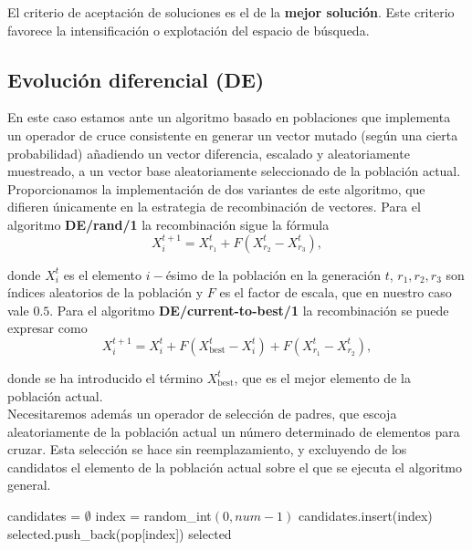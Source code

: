 \documentclass[12pt]{article}
\begin{document}
El criterio de aceptación de soluciones es el de la \textbf{mejor solución}. Este criterio favorece la intensificación  o explotación del espacio de búsqueda.

\subsection*{Evolución diferencial (DE)}
\label{ed}

En este caso estamos ante un algoritmo basado en poblaciones que implementa un operador de cruce consistente en generar un vector mutado (según una cierta probabilidad) añadiendo un vector diferencia, escalado y aleatoriamente muestreado, a un vector base aleatoriamente seleccionado de la población actual.\\

Proporcionamos la implementación de dos variantes de este algoritmo, que difieren únicamente en la estrategia de recombinación de vectores. Para el algoritmo \textbf{DE/rand/1} la recombinación sigue la fórmula
$$X^{t+1}_i= X^t_{r_1} + F (X^t_{r_2} - X^t_{r_3}),$$

donde $X^t_i$ es el elemento $i-$ésimo de la población en la generación $t$, $r_1, r_2, r_3$ son índices aleatorios de la población y $F$ es el factor de escala, que en nuestro caso vale $0.5$. Para el algoritmo \textbf{DE/current-to-best/1} la recombinación se puede expresar como
$$X^{t+1}_i= X^t_{i} + F (X^t_{\text{best}} - X^t_{i}) + F(X^t_{r_1} - X^t_{r_2}),$$

donde se ha introducido el término $X^t_{\text{best}}$, que es el mejor elemento de la población actual.\\

Necesitaremos además un operador de selección de padres, que escoja aleatoriamente de la población actual un número determinado de elementos para cruzar. Esta selección se hace sin reemplazamiento, y excluyendo de los candidatos el elemento de la población actual sobre el que se ejecuta el algoritmo general.

\begin{algorithm}[h!]
\begin{algorithmic}


\State candidates = $\emptyset$  
  
        \State index = random\_int$(0, num-1)$
            \State candidates.insert(index)
        \EndIf
    \EndWhile
    \State selected.push\_back(pop[index])
\EndFor
\State \Return selected

\EndFunction
\end{algorithmic}
\end{algorithm}
\end{document}

